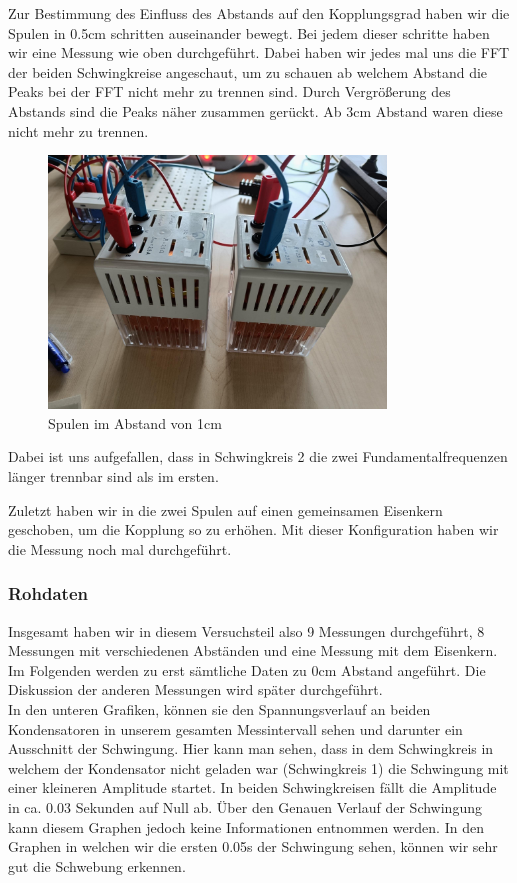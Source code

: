 \documentclass[twoside]{protokoll}
\begin{document}
Zur Bestimmung des Einfluss des Abstands auf den Kopplungsgrad haben wir die Spulen in 0.5cm schritten auseinander bewegt. 
Bei jedem dieser schritte haben wir eine Messung wie oben durchgeführt. Dabei haben wir jedes mal uns die FFT der beiden Schwingkreise angeschaut, um zu schauen ab welchem Abstand die Peaks bei der FFT nicht mehr zu trennen sind. Durch Vergrößerung des Abstands sind die Peaks näher zusammen gerückt.
Ab 3cm Abstand waren diese nicht mehr zu trennen.

\begin{figure}[H]
    \centering
    \includegraphics[width=0.8\textwidth]{bilder/Abstand_Spulen.pdf}
    \caption{Spulen im Abstand von 1cm}
\end{figure}



Dabei ist uns aufgefallen, dass in Schwingkreis 2 die zwei Fundamentalfrequenzen länger trennbar sind als im ersten. 

Zuletzt haben wir in die zwei Spulen auf einen gemeinsamen Eisenkern geschoben, um die Kopplung so zu erhöhen. Mit dieser Konfiguration haben wir die Messung noch mal durchgeführt. 

\subsubsection{Rohdaten}

Insgesamt haben wir in diesem Versuchsteil also 9 Messungen durchgeführt, 8 Messungen mit verschiedenen Abständen und eine Messung mit dem Eisenkern. 
Im Folgenden werden zu erst sämtliche Daten zu 0cm Abstand angeführt. Die Diskussion der anderen Messungen wird später durchgeführt.\\


In den unteren Grafiken, können sie den Spannungsverlauf an beiden Kondensatoren in unserem gesamten Messintervall sehen und darunter ein Ausschnitt der Schwingung. 
Hier kann man sehen, dass in dem Schwingkreis in welchem der Kondensator nicht geladen war (Schwingkreis 1) die Schwingung mit einer kleineren Amplitude startet. 
In beiden Schwingkreisen fällt die Amplitude in ca. 0.03 Sekunden auf Null ab.
Über den Genauen Verlauf der Schwingung kann diesem Graphen jedoch keine Informationen entnommen werden. 
In den Graphen in welchen wir die ersten 0.05s der Schwingung sehen, können wir sehr gut die Schwebung erkennen. 
\end{document}
